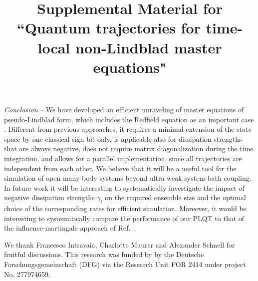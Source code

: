 \documentclass[twocolumn,prl,superscriptaddress]{revtex4-2}
\makeatletter
\def\maketitle{
	\@author@finish
	\title@column\titleblock@produce
	\suppressfloats[t]}
\makeatother
\begin{document}
\textit{Conclusion.--} We have developed an efficient unraveling of master equations of pseudo-Lindblad form, which includes the Redfield equation as an important case \cite{TBecker2021}. Different from previous approaches, it requires a minimal extension of the state space by one classical sign bit only, is applicable also for dissipation strengths that are always negative, does not require matrix diagonalization during the time integration, and allows for a parallel implementation, since all trajectories are independent from each other. We believe that it will be a useful tool for the simulation of open many-body systems beyond ultra weak system-bath coupling. In future work it will be interesting to systematically investigate the impact of negative dissipation strengths $\gamma_i$ on the required ensemble size and the optimal choice of the corresponding rates for efficient simulation. Moreover, it would be interesting to systematically compare the performance of our PLQT to that of the influence-martingale approach of Ref.~\cite{DonvilMGinanneschi2022}.

\begin{acknowledgments}
We thank Francesco Intravaia, Charlotte Maurer and Alexander Schnell for fruitful discussions. 
This research was funded by by the Deutsche Forschungsgemeinschaft (DFG) via the Research Unit FOR 2414 under project No. 277974659.
\end{acknowledgments}
















\clearpage

\title{Supplemental Material for\\``Quantum trajectories for time-local non-Lindblad master equations"}
\maketitle
\end{document}

